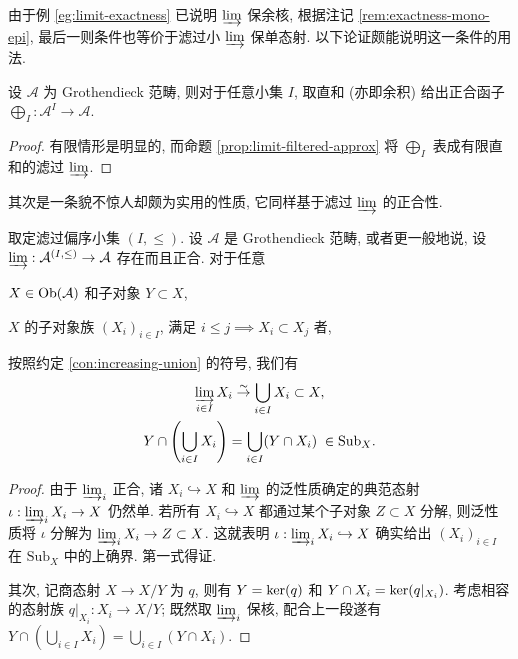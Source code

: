 由于例 \ref{eg:limit-exactness} 已说明 $\varinjlim$ 保余核, 根据注记 \ref{rem:exactness-mono-epi}, 最后一则条件也等价于滤过小 $\varinjlim$ 保单态射. 以下论证颇能说明这一条件的用法.

\begin{proposition}\label{prop:Grothendieck-cat-coprod-exact}
	设 $\mathcal{A}$ 为 Grothendieck 范畴, 则对于任意小集 $I$, 取直和 (亦即余积) 给出正合函子 $\bigoplus_I: \mathcal{A}^I \to \mathcal{A}$.
\end{proposition}
\begin{proof}
	有限情形是明显的, 而命题 \ref{prop:limit-filtered-approx} 将 $\bigoplus_I$ 表成有限直和的滤过 $\varinjlim$.
\end{proof}

其次是一条貌不惊人却颇为实用的性质, 它同样基于滤过 $\varinjlim$ 的正合性.

\begin{proposition}\label{prop:Grothendieck-cat-intersection}
	取定滤过偏序小集 $(I, \leq)$. 设 $\mathcal{A}$ 是 Grothendieck 范畴, 或者更一般地说, 设 $\varinjlim: \mathcal{A}^{(I, \leq)} \to \mathcal{A}$ 存在而且正合. 对于任意
	\begin{compactitem}
		\item $X \in \operatorname{Ob}(\mathcal{A})$ 和子对象 $Y \subset X$,
		\item $X$ 的子对象族 $\left( X_i \right)_{i \in I}$, 满足 $i \leq j \implies X_i \subset X_j$ 者,
	\end{compactitem}
	按照约定 \ref{con:increasing-union} 的符号, 我们有
	\begin{gather*}
		\varinjlim_{i \in I} X_i \stackrel{\sim}{\rightarrow} \bigcup_{i \in I} X_i \subset X, \\
		Y \cap \left( \bigcup_{i \in I} X_i \right) = \bigcup_{i \in I} (Y \cap X_i) \; \in \mathrm{Sub}_X.
	\end{gather*}
\end{proposition}
\begin{proof}
	由于 $\varinjlim_i$ 正合, 诸 $X_i \hookrightarrow X$ 和 $\varinjlim$ 的泛性质确定的典范态射 $\iota: \varinjlim_i X_i \to X$ 仍然单. 若所有 $X_i \hookrightarrow X$ 都通过某个子对象 $Z \subset X$ 分解, 则泛性质将 $\iota$ 分解为 $\varinjlim_i X_i \to Z \subset X$. 这就表明 $\iota: \varinjlim_i X_i \hookrightarrow X$ 确实给出 $(X_i)_{i \in I}$ 在 $\mathrm{Sub}_X$ 中的上确界. 第一式得证.
	
	其次, 记商态射 $X \to X/Y$ 为 $q$, 则有 $Y = \operatorname{ker}(q)$ 和 $Y \cap X_i = \operatorname{ker}(q|_{X_i})$. 考虑相容的态射族 $q|_{X_i}: X_i \to X/Y$; 既然取 $\varinjlim_i$ 保核, 配合上一段遂有 $Y \cap \left( \bigcup_{i \in I} X_i \right) = \bigcup_{i \in I} (Y \cap X_i)$.
\end{proof}

